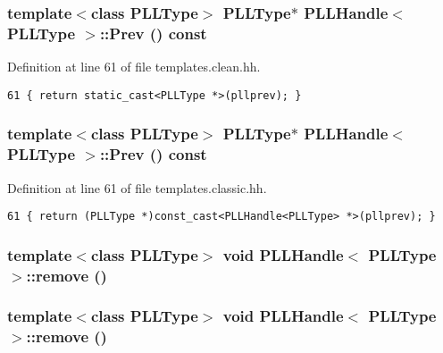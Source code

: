 \subsubsection{\setlength{\rightskip}{0pt plus 5cm}template$<$class PLLType$>$ {\bf PLLType}$\ast$ PLLHandle$<$ {\bf PLLType} $>$::Prev () const\hspace{0.3cm}{\tt  [inline]}}\label{classPLLHandle_a15}




Definition at line 61 of file templates.clean.hh.



\footnotesize\begin{verbatim}61 { return static_cast<PLLType *>(pllprev); } 
\end{verbatim}\normalsize 
{}
\subsubsection{\setlength{\rightskip}{0pt plus 5cm}template$<$class PLLType$>$ {\bf PLLType}$\ast$ PLLHandle$<$ {\bf PLLType} $>$::Prev () const\hspace{0.3cm}{\tt  [inline]}}\label{classPLLHandle_a2}




Definition at line 61 of file templates.classic.hh.



\footnotesize\begin{verbatim}61 { return (PLLType *)const_cast<PLLHandle<PLLType> *>(pllprev); } 
\end{verbatim}\normalsize 
{}
\subsubsection{\setlength{\rightskip}{0pt plus 5cm}template$<$class PLLType$>$ void PLLHandle$<$ {\bf PLLType} $>$::remove ()\hspace{0.3cm}{\tt  [inline]}}\label{classPLLHandle_a51}


\subsubsection{\setlength{\rightskip}{0pt plus 5cm}template$<$class PLLType$>$ void PLLHandle$<$ {\bf PLLType} $>$::remove ()\hspace{0.3cm}{\tt  [inline]}}\label{classPLLHandle_a38}


